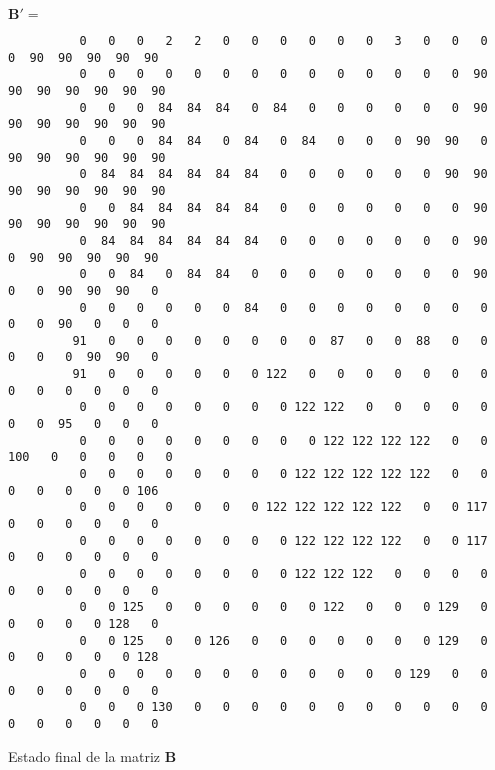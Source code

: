 \begin{listado}                                                                                
$\mathbf{B}' = $                                                                               
\tiny                                                                                          
\begin{verbatim}                                                                               
          0   0   0   2   2   0   0   0   0   0   0   3   0   0   0   0  90  90  90  90  90
          0   0   0   0   0   0   0   0   0   0   0   0   0   0  90  90  90  90  90  90  90
          0   0   0  84  84  84   0  84   0   0   0   0   0   0  90  90  90  90  90  90  90
          0   0   0  84  84   0  84   0  84   0   0   0  90  90   0  90  90  90  90  90  90
          0  84  84  84  84  84  84   0   0   0   0   0   0  90  90  90  90  90  90  90  90
          0   0  84  84  84  84  84   0   0   0   0   0   0   0  90  90  90  90  90  90  90
          0  84  84  84  84  84  84   0   0   0   0   0   0   0  90   0  90  90  90  90  90
          0   0  84   0  84  84   0   0   0   0   0   0   0   0  90   0   0  90  90  90   0
          0   0   0   0   0   0  84   0   0   0   0   0   0   0   0   0   0  90   0   0   0
         91   0   0   0   0   0   0   0   0  87   0   0  88   0   0   0   0   0  90  90   0
         91   0   0   0   0   0   0 122   0   0   0   0   0   0   0   0   0   0   0   0   0
          0   0   0   0   0   0   0   0 122 122   0   0   0   0   0   0   0  95   0   0   0
          0   0   0   0   0   0   0   0   0 122 122 122 122   0   0 100   0   0   0   0   0
          0   0   0   0   0   0   0   0 122 122 122 122 122   0   0   0   0   0   0   0 106
          0   0   0   0   0   0   0 122 122 122 122 122   0   0 117   0   0   0   0   0   0
          0   0   0   0   0   0   0   0 122 122 122 122   0   0 117   0   0   0   0   0   0
          0   0   0   0   0   0   0   0 122 122 122   0   0   0   0   0   0   0   0   0   0
          0   0 125   0   0   0   0   0   0 122   0   0   0 129   0   0   0   0   0 128   0
          0   0 125   0   0 126   0   0   0   0   0   0   0 129   0   0   0   0   0   0 128
          0   0   0   0   0   0   0   0   0   0   0   0 129   0   0   0   0   0   0   0   0
          0   0   0 130   0   0   0   0   0   0   0   0   0   0   0   0   0   0   0   0   0            
\end{verbatim}
\caption{Estado final de la matriz $\mathbf{B}$}
\label{lis:arraybb}
\end{listado}

